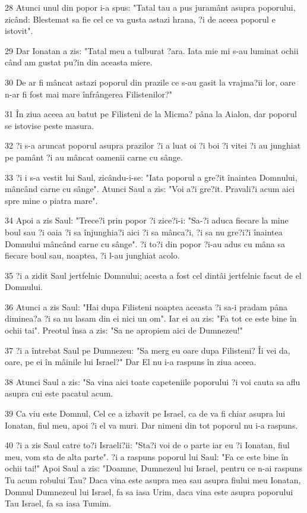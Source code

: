 \par 28 Atunci unul din popor i-a spus: "Tatal tau a pus juramânt asupra poporului, zicând: Blestemat sa fie cel ce va gusta astazi hrana, ?i de aceea poporul e istovit".
\par 29 Dar Ionatan a zis: "Tatal meu a tulburat ?ara. Iata mie mi s-au luminat ochii când am gustat pu?in din aceasta miere.
\par 30 De ar fi mâncat astazi poporul din prazile ce s-au gasit la vrajma?ii lor, oare n-ar fi fost mai mare înfrângerea Filistenilor?"
\par 31 În ziua aceea au batut pe Filisteni de la Micma? pâna la Aialon, dar poporul se istovise peste masura.
\par 32 ?i s-a aruncat poporul asupra prazilor ?i a luat oi ?i boi ?i vitei ?i au junghiat pe pamânt ?i au mâncat oamenii carne cu sânge.
\par 33 ?i i s-a vestit lui Saul, zicându-i-se: "Iata poporul a gre?it înaintea Domnului, mâncând carne cu sânge". Atunci Saul a zis: "Voi a?i gre?it. Pravali?i acum aici spre mine o piatra mare".
\par 34 Apoi a zis Saul: "Trece?i prin popor ?i zice?i-i: "Sa-?i aduca fiecare la mine boul sau ?i oaia ?i sa înjunghia?i aici ?i sa mânca?i, ?i sa nu gre?i?i înaintea Domnului mâncând carne cu sânge". ?i to?i din popor ?i-au adus cu mâna sa fiecare boul sau, noaptea, ?i l-au junghiat acolo.
\par 35 ?i a zidit Saul jertfelnic Domnului; acesta a fost cel dintâi jertfelnic facut de el Domnului.
\par 36 Atunci a zis Saul: "Hai dupa Filisteni noaptea aceasta ?i sa-i pradam pâna diminea?a ?i sa nu lasam din ei nici un om". Iar ei au zis: "Fa tot ce este bine în ochii tai". Preotul însa a zis: "Sa ne apropiem aici de Dumnezeu!"
\par 37 ?i a întrebat Saul pe Dumnezeu: "Sa merg eu oare dupa Filisteni? Îi vei da, oare, pe ei în mâinile lui Israel?" Dar El nu i-a raspuns în ziua aceea.
\par 38 Atunci Saul a zis: "Sa vina aici toate capeteniile poporului ?i voi cauta sa aflu asupra cui este pacatul acum.
\par 39 Ca viu este Domnul, Cel ce a izbavit pe Israel, ca de va fi chiar asupra lui Ionatan, fiul meu, apoi ?i el va muri. Dar nimeni din tot poporul nu i-a raspuns.
\par 40 ?i a zis Saul catre to?i Israeli?ii: "Sta?i voi de o parte iar eu ?i Ionatan, fiul meu, vom sta de alta parte". ?i a raspuns poporul lui Saul: "Fa ce este bine în ochii tai!" Apoi Saul a zis: "Doamne, Dumnezeul lui Israel, pentru ce n-ai raspuns Tu acum robului Tau? Daca vina este asupra mea sau asupra fiului meu Ionatan, Domnul Dumnezeul lui Israel, fa sa iasa Urim, daca vina este asupra poporului Tau Israel, fa sa iasa Tumim.
